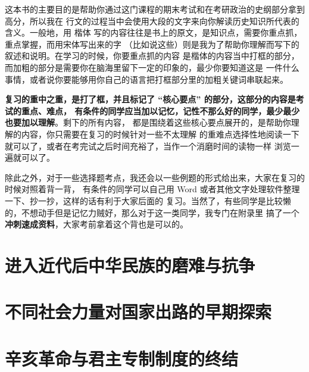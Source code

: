 \documentclass[10pt, UTF8]{book} %
\begin{document}
这本书的主要目的是帮助你通过这门课程的期末考试和在考研政治的史纲部分拿到高分，所以我在
行文的过程当中会使用大段的文字来向你解读历史知识所代表的含义。一般地，用 \kaishu 楷体
\songti 写的内容往往是书上的原文，是知识点，需要你重点抓，重点掌握，而用宋体写出来的字
（比如说这些）则是我为了帮助你理解而写下的叙述和说明。在学习的时候，你要重点抓的内容
是楷体的内容当中打框的部分，而加粗的部分是需要你在脑海里留下一定的印象的，最少你要知道这是
一件什么事情，或者说你要能够用你自己的语言把打框部分里的加粗关键词串联起来。

\textbf{复习的重中之重，是打了框，并且标记了 “核心要点” 的部分，这部分的内容是考试的重点、难点，
有条件的同学应当加以记忆，记性不那么好的同学，最少最少也要加以理解}。剩下的所有内容，
都是围绕着这些核心要点展开的，是帮助你理解的内容，你只需要在复习的时候针对一些不太理解
的重难点选择性地阅读一下就可以了，或者在考完试之后时间充裕了，当作一个消磨时间的读物一样
浏览一遍就可以了。

除此之外，对于一些选择题考点，我还会以一些例题的形式给出来，大家在复习的时候对照着背一背，
有条件的同学可以自己用 Word 或者其他文字处理软件整理一下、抄一抄，这样的话有利于大家后面的
复习。当然了，有些同学是比较懒的，不想动手但是记忆力贼好，那么对于这一类同学，我专门在附录里
搞了一个\textbf{冲刺速成资料}，大家考前拿着这个背也是可以的。

\newpage
\thispagestyle{empty}

\makeatletter
\let\ps@plain\ps@empty
\makeatother
\mainmatter

\chapter{进入近代后中华民族的磨难与抗争}
\thispagestyle{empty}


\clearpage
\thispagestyle{empty}

\chapter{不同社会力量对国家出路的早期探索}
\thispagestyle{empty}

\setcounter{example}{0}
\setcounter{thm}{0}

\quad\quad 

\clearpage
\thispagestyle{empty}

\chapter{辛亥革命与君主专制制度的终结}
\thispagestyle{empty}
\end{document}
